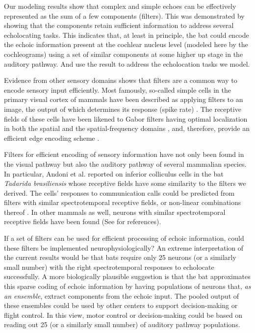 \documentclass[10pt,letterpaper]{article}
\begin{document}
Our modeling results show that complex and simple echoes can be effectively represented as the sum of a few components (filters). This was demonstrated by showing that the components retain sufficient information to address several echolocating tasks. This indicates that, at least in principle, the bat could encode the echoic information present at the cochlear nucleus level (modeled here by the cochleograms) using a set of similar components at some higher up stage in the auditory pathway. And use the result to address the echolocation tasks we model.

Evidence from other sensory domains shows that filters are a common way to encode sensory input efficiently. Most famously, so-called simple cells in the primary visual cortex of mammals have been described as applying filters to an image, the output of which determines its response (spike rate) \cite{Carandini2006}. The receptive fields of these cells have been likened to Gabor filters \cite{Marcelja1980} having optimal localization in both the spatial and the spatial-frequency domains \cite{Daugman1985}, and, therefore, provide an efficient edge encoding scheme \cite{Marcelja1980}.

Filters for efficient encoding of sensory information have not only been found in the visual pathway but also the auditory pathway of several mammalian species. In particular, Andoni et al. \cite{Andoni2007} reported on inferior colliculus cells in the bat \textit{Tadarida brasiliensis} whose receptive fields have some similarity to the filters we derived. The cells' responses to communication calls could be predicted from filters with similar spectrotemporal receptive fields, or non-linear combinations thereof \cite{Andoni2011}. In other mammals as well, neurons with similar spectrotemporal receptive fields have been found (See \cite{Carlson2012} for references). 

If a set of filters can be used for efficient processing of echoic information, could these filters be implemented neurophysiologically? An extreme interpretation of the current results would be that bats require only 25 neurons (or a similarly small number) with the right spectrotemporal responses to echolocate successfully. A more biologically plausible suggestion is that the bat approximates this sparse coding of echoic information by having populations of neurons that, \emph{as an ensemble}, extract components from the echoic input. The pooled output of these ensembles could be used by other centers to support decision-making or flight control. In this view, motor control or decision-making could be based on reading out 25 (or a similarly small number) of auditory pathway populations. 
\end{document}
